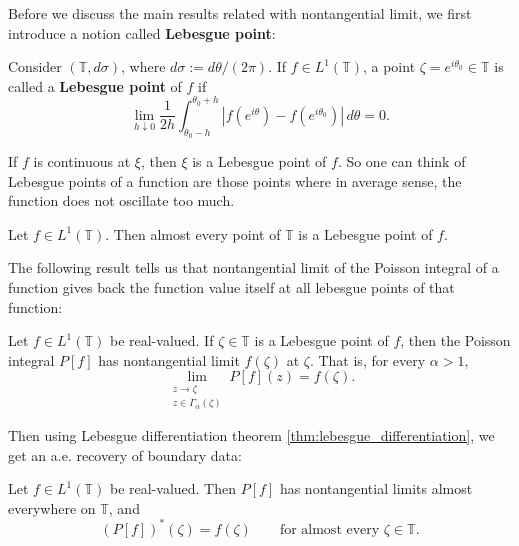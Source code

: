 Before we discuss the main results related with nontangential limit, we first 
introduce a notion called \textbf{Lebesgue point}:
\begin{definition}
Consider $(\mathbb{T},d\sigma)$, where $d\sigma := d\theta/(2\pi)$.
If $f\in L^1(\mathbb{T})$, a point $\zeta=e^{i\theta_0}\in\mathbb{T}$
is called a \textbf{Lebesgue point} of $f$ if
\begin{equation*}
  \lim_{h\downarrow 0}
  \frac{1}{2h}
  \int_{\theta_0-h}^{\theta_0+h}
  \left|f(e^{i\theta})-f(e^{i\theta_0})\right|\,d\theta=0.
\end{equation*}
\end{definition}

\begin{remark}
If $f$ is continuous at $\xi$, then $\xi$ is a Lebesgue point of $f$. So one can
think of Lebesgue points of a function are those points where in average sense, the
function does not oscillate too much.
\end{remark}

\begin{theorem}
\label{thm:lebesgue_differentiation}
Let $f\in L^1(\mathbb{T})$. Then almost every point of $\mathbb{T}$
 is a Lebesgue point of $f$.
\end{theorem}

The following result tells us that nontangential limit of
the Poisson integral of a function gives back the function value itself
at all lebesgue points of that function:
\begin{theorem}
\label{thm:poisson_nontangential_lebesgue_point}
Let $f\in L^1(\mathbb{T})$ be real-valued. If $\zeta\in\mathbb{T}$ is a
Lebesgue point of $f$, then the Poisson integral $P[f]$ has nontangential
limit $f(\zeta)$ at $\zeta$. That is, for every $\alpha>1$,
\begin{equation*}
  \lim_{\substack{z\to\zeta\\ z\in\Gamma_\alpha(\zeta)}}P[f](z)=f(\zeta).
\end{equation*}
\end{theorem}

Then using Lebesgue differentiation theorem \ref{thm:lebesgue_differentiation},
we get an a.e. recovery of boundary data:
\begin{corollary}
\label{cor:poisson_nontangential_ae}
Let $f\in L^1(\mathbb{T})$ be real-valued. Then $P[f]$ has nontangential
limits almost everywhere on $\mathbb{T}$, and
\begin{equation*}
  (P[f])^*(\zeta)=f(\zeta)
  \qquad\text{for almost every }\zeta\in\mathbb{T}.
\end{equation*}
\end{corollary}

